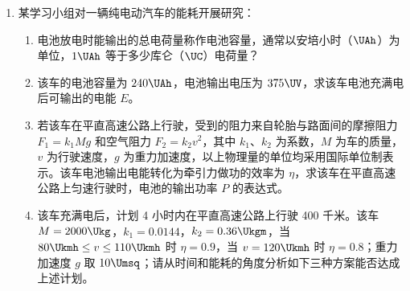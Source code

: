 \documentclass[\gkver]{gaokaozhenti}
\begin{document}
\begin{enumerate}

\item
某学习小组对一辆纯电动汽车的能耗开展研究：

\begin{enumerate}
	\item
	电池放电时能输出的总电荷量称作电池容量，通常以安培小时（$\UAh$）为单位，$1\UAh$ 等于多少库仑（$\UC$）电荷量？
	\item
	该车的电池容量为 $240 \UAh$，电池输出电压为 $375 \UV$，求该车电池充满电后可输出的电能 $E$。
	\item
	若该车在平直高速公路上行驶，受到的阻力来自轮胎与路面间的摩擦阻力 $F_{1} = k_{1}Mg$ 和空气阻力 $F_{2} = k_{2}v^{2}$，其中 $k_{1}$、$k_{2}$ 为系数，$M$ 为车的质量，$v$ 为行驶速度，$g$ 为重力加速度，以上物理量的单位均采用国际单位制表示。该车电池输出电能转化为牵引力做功的效率为 $\eta$，求该车在平直高速公路上匀速行驶时，电池的输出功率 $P$ 的表达式。
	\item
	该车充满电后，计划 4 小时内在平直高速公路上行驶 400 千米。该车 $M = 2000 \Ukg$，$k_{1} = 0.0144$，$k_{2} = 0.36 \Ukgm$，当 $80 \Ukmh \leq v \leq 110 \Ukmh$ 时 $\eta = 0.9$，当 $v = 120 \Ukmh$ 时 $\eta = 0.8$；重力加速度 $g$ 取 $10 \Umsq$；请从时间和能耗的角度分析如下三种方案能否达成上述计划。


\end{enumerate}
\end{enumerate}
\end{document}

